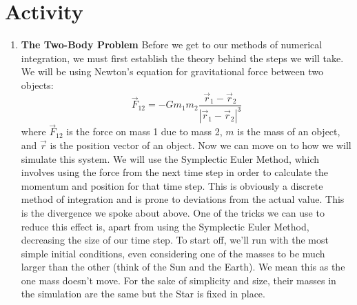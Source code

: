 \documentclass[12pt]{article}
\begin{document}
    \section{Activity}
    \begin{enumerate}
        \item \textbf{The Two-Body Problem} \newline
        Before we get to our methods of numerical integration, we must first establish the theory behind 
        the steps we will take. We will be using Newton's equation for gravitational force between two 
        objects:
        \begin{equation}
            \vec{F}_{12} = -Gm_1m_2\frac{\vec{r}_1-\vec{r}_2}{|\vec{r}_1-\vec{r}_2|^3}
        \end{equation}
        where $\vec{F}_{12}$ is the force on mass 1 due to mass 2, $m$ is the mass of an object, and 
        $\vec{r}$ is the position vector of an object. \newline
        Now we can move on to how we will simulate this system. We will use the Symplectic Euler Method, 
        which involves using the force from the next time step in order to calculate the momentum and 
        position for that time step. This is obviously a discrete method of integration and is prone to 
        deviations from the actual value. This is the divergence we spoke about above. One of the tricks we 
        can use to reduce this effect is, apart from using the Symplectic Euler Method, decreasing the size 
        of our time step. \newline
        To start off, we'll run with the most simple initial conditions, even considering one of the masses 
        to be much larger than the other (think of the Sun and the Earth). We mean this as the one mass 
        doesn't move. For the sake of simplicity and size, their masses in the simulation are the same but 
        the Star is fixed in place.


\end{enumerate}
\end{document}
